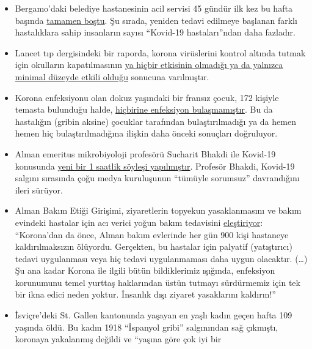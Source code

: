 \begin{itemize}
{  kaldığını} bildiriyor. Yetkililere göre, yeni hasta kabulündeki artış,
  bitmeye yüz tutmuş durumdadır.
\item
  Bergamo'daki belediye hastanesinin acil servisi 45 gündür ilk kez bu
  hafta başında \href{https://orf.at/stories/3162642/}{tamamen boştu}.
  Şu sırada, yeniden tedavi edilmeye başlanan farklı hastalıklara sahip
  insanların sayısı ``Kovid-19 hastaları''ndan daha fazladır.
\item
  Lancet tıp dergisindeki bir raporda, korona virüslerini kontrol
  altında tutmak için okulların kapatılmasının
  \href{https://www.thelancet.com/journals/lanchi/article/PIIS2352-4642(20)30095-X/fulltext}{ya
  hiçbir etkisinin olmadığı ya da yalnızca minimal düzeyde etkili
  olduğu} sonucuna varılmıştır.
\item
  Korona enfeksiyonu olan dokuz yaşındaki bir fransız çocuk, 172 kişiyle
  temasta bulunduğu halde,
  \href{https://www.n-tv.de/panorama/172-Kontaktpersonen-von-Corona-verschont-article21727469.html}{hiçbirine
  enfeksiyon bulaşmamıştır}. Bu da hastalığın (gribin aksine) çocuklar
  tarafından bulaştırılmadığı ya da hemen hemen hiç bulaştırılmadığına
  ilişkin daha önceki sonuçları doğruluyor.
\item
  Alman emeritus mikrobiyoloji profesörü Sucharit Bhakdi ile Kovid-19
  konusunda
  \href{https://kenfm.de/kenfm-am-set-gespraech-mit-prof-dr-sucharit-bhakdi-zu-covid-19/}{yeni
  bir 1 saatlik söyleşi yapılmıştır}. Profesör Bhakdi, Kovid-19 salgını
  sırasında çoğu medya kuruluşunun ``tümüyle sorumsuz'' davrandığını
  ileri sürüyor.
\item
  Alman Bakım Etiği Girişimi, ziyaretlerin topyekun yasaklanmasını ve
  bakım evindeki hastalar için acı verici yoğun bakım tedavisini
  \href{http://pflegeethik-initiative.de/2020/04/15/corona-krise-falsche-prioritaeten-gesetzt-und-ethische-prinzipien-verletzt/}{eleştiriyor}:
  ``Korona'dan da önce, Alman bakım evlerinde her gün 900 kişi hastaneye
  kaldırılmaksızın ölüyordu. Gerçekten, bu hastalar için palyatif
  (yatıştırıcı) tedavi uygulanması veya hiç tedavi uygulanmaması daha
  uygun olacaktır. (\ldots{}) Şu ana kadar Korona ile ilgili bütün
  bildiklerimiz ışığında, enfeksiyon korunumunu temel yurttaş
  haklarından üstün tutmayı sürdürmemiz için tek bir ikna edici neden
  yoktur. İnsanlık dışı ziyaret yasaklarını kaldırın!''
\item
  İsviçre'deki St. Gallen kantonunda yaşayan en yaşlı kadın geçen hafta
  109 yaşında öldü. Bu kadın 1918 ``İspanyol gribi'' salgınından sağ
  çıkmıştı, koronaya yakalanmış değildi ve ``yaşına göre çok iyi bir

\end{itemize}
